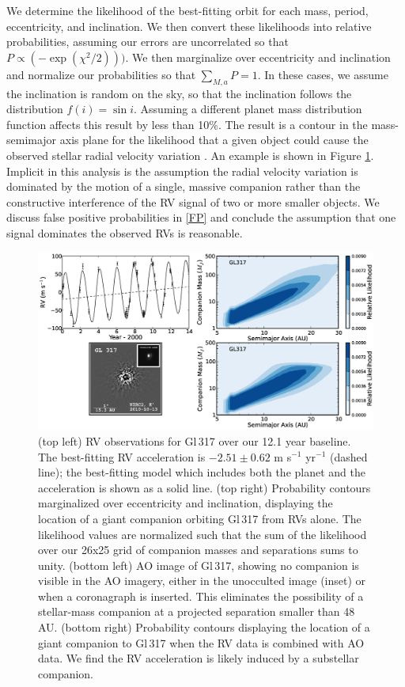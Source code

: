 We determine the likelihood of the best-fitting orbit for each mass, period, eccentricity, and inclination. We then convert these likelihoods into relative probabilities, assuming our errors are uncorrelated so that $P \propto(-\exp(\chi^2/2)))$. We then marginalize over eccentricity and inclination and normalize our probabilities so that $\displaystyle\sum\limits_{M,a} P = 1$. In these cases, we assume the inclination is random on the sky, so that the inclination follows the distribution $f(i) = \sin i$. Assuming a different planet mass distribution function affects this result by less than 10\%. The result is a contour in the mass-semimajor axis plane for the likelihood that a given object could cause the observed stellar radial velocity variation \citep{Wright07}. An example is shown in Figure \ref{WrightRV}. Implicit in this analysis is the assumption the radial velocity variation is dominated by the motion of a single, massive companion rather than the constructive interference of the RV signal of two or more smaller objects. We discuss false positive probabilities in \textsection\ref{FP} and conclude the assumption that one signal dominates the observed RVs is reasonable.

\begin{figure}[htbp]
\centerline{\includegraphics[width=1.0\textwidth, trim={0 0 0 0}, clip=true ]{chapter3/f6.eps}}
\caption[RVs for Gl\,317 and parameter space where a distant companion could reside before and after AO imaging]{(top left) RV observations for Gl\,317 over our 12.1 year baseline. The best-fitting RV acceleration is $-2.51 \pm 0.62$ m s$^{-1}$ yr$^{-1}$ (dashed line); the best-fitting model which includes both the planet and the acceleration is shown as a solid line. (top right) Probability contours marginalized over eccentricity and inclination, displaying the location of a giant companion orbiting Gl\,317 from RVs alone. The likelihood values are normalized such that the sum of the likelihood over our 26x25 grid of companion masses and separations sums to unity. (bottom left) AO image of Gl\,317, showing no companion is visible in the AO imagery, either in the unocculted image (inset) or when a coronagraph is inserted. This eliminates the possibility of a stellar-mass companion at a projected separation smaller than 48 AU. (bottom right) Probability contours displaying the location of a giant companion to Gl\,317 when the RV data is combined with AO data. We find the RV acceleration is likely induced by a substellar companion.
  }
\label{WrightRV}
\end{figure}


